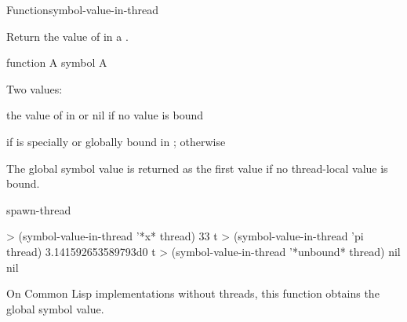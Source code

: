 \documentclass[10pt,twoside,english,pdftex]{article}
\begin{document}
\begin{functiondoc}{Function}{symbol-value-in-thread}{
    \returns{} \mbox{}}
%
%

\fnsyntax

\fnpurpose Return the value of  in a .

\fnpackage {}

\fnmodule {}

\fnargs
\begin{args}{function}
\arg[symbol] A symbol
\arg[thread] A 
\end{args}

\fnreturns Two values:
\begin{tightitemize}
\item the value of  in  or nil if no value is
  bound
\item {} if  is specially or globally bound in 
  ; otherwise \nil
\end{tightitemize}
  
\fndescription The global symbol value is returned as the first value if no
thread-local value is bound.

\begin{alsos}{spawn-thread}
\end{alsos}

\fnexamples
\begin{example}
> (symbol-value-in-thread '*x* thread)
33
t
> (symbol-value-in-thread 'pi thread)
3.141592653589793d0
t
> (symbol-value-in-thread '*unbound* thread)
nil
nil
\end{example}

\fnnotes On Common Lisp implementations without threads, this function obtains
the global symbol value.

\end{functiondoc}

\end{document}
